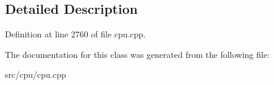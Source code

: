 \subsection{Detailed Description}


Definition at line 2760 of file cpu.\-cpp.



The documentation for this class was generated from the following file\-:\begin{DoxyCompactItemize}
\item 
src/cpu/cpu.\-cpp\end{DoxyCompactItemize}
